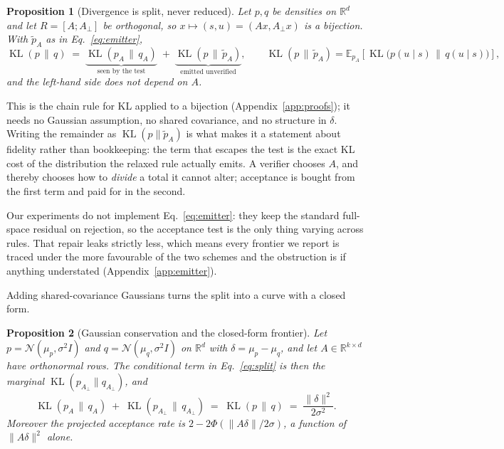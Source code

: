 \documentclass[10pt]{article}
\newtheorem{proposition}{Proposition}
\DeclareMathOperator{\KL}{KL}
\newcommand{\R}{\mathbb{R}}
\newcommand{\E}{\mathbb{E}}
\newcommand{\dd}{d}
\newcommand{\kk}{k}
\begin{document}
\begin{proposition}[Divergence is split, never reduced]
\label{prop:split}
Let $p, q$ be densities on $\R^\dd$ and let $R = [A; A_\perp]$ be orthogonal, so $x \mapsto (s,u) =
(Ax, A_\perp x)$ is a bijection. With $\tilde{p}_A$ as in Eq.~\ref{eq:emitter},
\begin{equation}
\KL(p \,\|\, q) \;=\; \underbrace{\KL(p_A \,\|\, q_A)}_{\text{seen by the test}}
\;+\; \underbrace{\KL(p \,\|\, \tilde{p}_A)}_{\text{emitted unverified}},
\qquad
\KL(p \,\|\, \tilde{p}_A) = \E_{p_A}\!\left[\KL\bigl(p(u \mid s) \,\|\, q(u \mid s)\bigr)\right],
\label{eq:split}
\end{equation}
and the left-hand side does not depend on $A$.
\end{proposition}

This is the chain rule for KL applied to a bijection (Appendix~\ref{app:proofs}); it needs no
Gaussian assumption, no shared covariance, and no structure in $\delta$. Writing the remainder as
$\KL(p \| \tilde{p}_A)$ is what makes it a statement about fidelity rather than bookkeeping: the term
that escapes the test is the exact KL cost of the distribution the relaxed rule actually emits. A
verifier chooses $A$, and thereby chooses how to \emph{divide} a total it cannot alter; acceptance is
bought from the first term and paid for in the second.

Our experiments do not implement Eq.~\ref{eq:emitter}: they keep the standard full-space residual on
rejection, so the acceptance test is the only thing varying across rules. That repair leaks strictly
less, which means every frontier we report is traced under the more favourable of the two schemes
and the obstruction is if anything understated (Appendix~\ref{app:emitter}).

Adding shared-covariance Gaussians turns the split into a curve with a closed form.

\begin{proposition}[Gaussian conservation and the closed-form frontier]
\label{prop:conservation}
Let $p = \mathcal{N}(\mu_p, \sigma^2 I)$ and $q = \mathcal{N}(\mu_q, \sigma^2 I)$ on $\R^\dd$ with
$\delta = \mu_p - \mu_q$, and let $A \in \R^{\kk\times\dd}$ have orthonormal rows. The conditional
term in Eq.~\ref{eq:split} is then the marginal $\KL(p_{A_\perp} \| q_{A_\perp})$, and
\begin{equation}
\KL(p_A \,\|\, q_A) \;+\; \KL(p_{A_\perp} \,\|\, q_{A_\perp}) \;=\; \KL(p \,\|\, q)
\;=\; \frac{\|\delta\|^2}{2\sigma^2}.
\label{eq:conservation}
\end{equation}
Moreover the projected acceptance rate is $2 - 2\Phi\!\left(\|A\delta\|/2\sigma\right)$, a function of
$\|A\delta\|^2$ alone.
\end{proposition}
\end{document}
